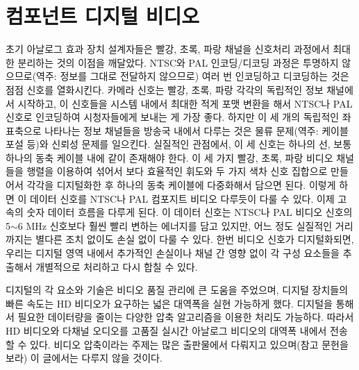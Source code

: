 \section{컴포넌트 디지털 비디오}
초기 아날로그 효과 장치 설계자들은 빨강, 초록, 파랑 채널을 신호처리 과정에서 최대한 분리하는 것의 이점을 깨달았다.
NTSC와 PAL 인코딩/디코딩 과정은 투명하지 않으므로(역주: 정보를 그대로 전달하지 않으므로) 여러 번 인코딩하고 디코딩하는 것은 점점 신호를 열화시킨다.
카메라 신호는 빨강, 초록, 파랑 각각의 독립적인 정보 채널에서 시작하고, 이 신호들을 시스템 내에서 최대한 적게 포맷 변환을 해서 NTSC나 PAL 신호로 인코딩하여 시청자들에게 보내는 게 가장 좋다.
하지만 이 세 개의 독립적인 좌표축으로 나타나는 정보 채널들을 방송국 내에서 다루는 것은 물류 문제(역주: 케이블 포설 등)와 신뢰성 문제를 일으킨다.
실질적인 관점에서, 이 세 신호는 하나의 선, 보통 하나의 동축 케이블 내에 같이 존재해야 한다.
이 세 가지 빨강, 초록, 파랑 비디오 채널들을 행렬을 이용하여 섞어서 보다 효율적인 휘도와 두 가지 색차 신호 집합으로 만들어서 각각을 디지털화한 후 하나의 동축 케이블에 다중화해서 담으면 된다.
이렇게 하면 이 데이터 신호를 NTSC나 PAL 컴포지트 비디오 다루듯이 다룰 수 있다. 이제 고속의 숫자 데이터 흐름을 다루게 된다.
이 데이터 신호는 NTSC나 PAL 비디오 신호의 5$\sim$6 MHz 신호보다 훨씬 빨리 변하는 에너지를 담고 있지만, 어느 정도 실질적인 거리까지는 별다른 조치 없이도 손실 없이 다룰 수 있다.
한번 비디오 신호가 디지털화되면, 우리는 디지털 영역 내에서 추가적인 손실이나 채널 간 영향 없이 각 구성 요소들을 추출해서 개별적으로 처리하고 다시 합칠 수 있다.

디지털의 각 요소와 기술은 비디오 품질 관리에 큰 도움을 주었으며, 디지털 장치들의 빠른 속도는 HD 비디오가 요구하는 넓은 대역폭을 실현 가능하게 했다.
디지털을 통해서 필요한 데이터량을 줄이는 다양한 압축 알고리즘을 이용한 처리도 가능하다.
따라서 HD 비디오와 다채널 오디오를 고품질 실시간 아날로그 비디오의 대역폭 내에서 전송할 수 있다.
비디오 압축이라는 주제는 많은 출판물에서 다뤄지고 있으며(참고 문헌을 보라) 이 글에서는 다루지 않을 것이다.